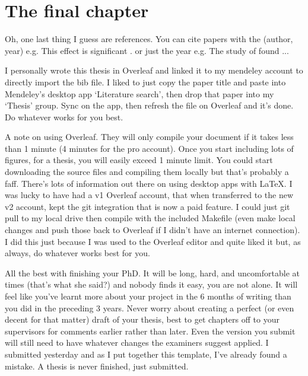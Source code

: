 \chapter[The final chapter]{The final chapter}
\label{ch:conclusions_futurework}

Oh, one last thing I guess are references. You can cite papers with the (author, year) e.g. This effect is significant \citep{Davies2015}. or just the year e.g. The study of \citet{Mound2019RegionalVariations} found ...

I personally wrote this thesis in Overleaf and linked it to my mendeley account to directly import the bib file. I liked to just copy the paper title and paste into Mendeley's desktop app `Literature search', then drop that paper into my `Thesis' group. Sync on the app, then refresh the file on Overleaf and it's done. Do whatever works for you best.

A note on using Overleaf. They will only compile your document if it takes less than 1 minute (4 minutes for the pro account). Once you start including lots of figures, for a thesis, you will easily exceed 1 minute limit. You could start downloading the source files and compiling them locally but that's probably a faff. There's lots of information out there on using desktop apps with \LaTeX. I was lucky to have had a v1 Overleaf account, that when transferred to the new v2 account, kept the git integration that is now a paid feature. I could just git pull to my local drive then compile with the included Makefile (even make local changes and push those back to Overleaf if I didn't have an internet connection). I did this just because I was used to the Overleaf editor and quite liked it but, as always, do whatever works best for you.

All the best with finishing your PhD. It will be long, hard, and uncomfortable at times (that's what she said?) and nobody finds it easy, you are not alone. It will feel like you've learnt more about your project in the 6 months of writing than you did in the preceding 3 years. Never worry about creating a perfect (or even decent for that matter) draft of your thesis, best to get chapters off to your supervisors for comments earlier rather than later. Even the version you submit will still need to have whatever changes the examiners suggest applied. I submitted yesterday and as I put together this template, I've already found a mistake. A thesis is never finished, just submitted.